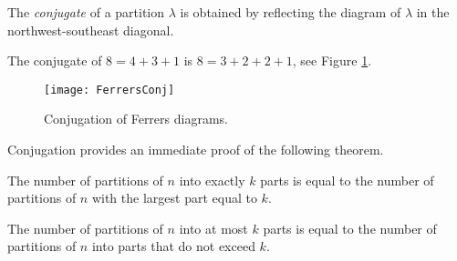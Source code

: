 \begin{page}
\setcounter{section}{3}
\setcounter{subsection}{6}
\setcounter{dfn}{13}
\label{portion:823}

\begin{dfn}
The \emph{conjugate} of a partition $\lambda$ is
obtained by reflecting the diagram of $\lambda$ in the northwest-southeast diagonal.
\end{dfn}

\end{page}

\begin{page}
\setcounter{section}{3}
\setcounter{subsection}{6}
\setcounter{dfn}{14}
\label{portion:826}

\begin{exl}
The conjugate of $8 = 4 + 3 + 1$ is $8 = 3 + 2 + 2 + 1$, see Figure \ref{fig:FerrersConj}.
\end{exl}

\end{page}

\begin{page}
\setcounter{section}{3}
\setcounter{subsection}{6}
\setcounter{dfn}{14}
\label{portion:827}


\begin{figure}[ht]
\begin{center}
\texttt{[image: FerrersConj]}
\end{center}
\caption{Conjugation of Ferrers diagrams.}
\label{fig:FerrersConj}
\end{figure}

Conjugation provides an immediate proof of the following theorem.


\end{page}

\begin{page}
\setcounter{section}{3}
\setcounter{subsection}{6}
\setcounter{dfn}{15}
\label{portion:829}

\begin{thm}
\label{thm:RestrPart}
The number of partitions of $n$ into exactly $k$ parts is equal to the number of partitions of $n$ with the largest part equal to $k$.

The number of partitions of $n$ into at most $k$ parts is equal to the number of partitions of $n$ into parts that do not exceed $k$.
\end{thm}

\end{page}


